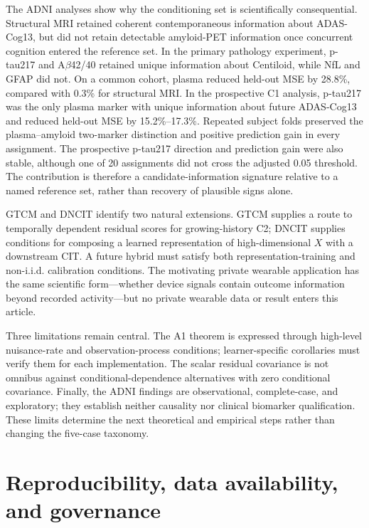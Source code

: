 \documentclass[11pt]{article}
\theoremstyle{definition}
\begin{document}
The ADNI analyses show why the conditioning set is scientifically consequential. Structural
MRI retained coherent contemporaneous information about ADAS-Cog13, but did not retain
detectable amyloid-PET information once concurrent cognition entered the reference set. In
the primary pathology experiment, p-tau217 and A$\beta$42/40 retained unique information
about Centiloid, while NfL and GFAP did not. On a common cohort, plasma reduced held-out MSE
by 28.8\%, compared with 0.3\% for structural MRI. In the prospective C1 analysis, p-tau217
was the only plasma marker with unique information about future ADAS-Cog13 and reduced
held-out MSE by 15.2\%--17.3\%. Repeated subject folds preserved the plasma--amyloid
two-marker distinction and positive prediction gain in every assignment. The prospective
p-tau217 direction and prediction gain were also stable, although one of 20 assignments did
not cross the adjusted 0.05 threshold. The contribution is therefore a candidate-information
signature relative to a named reference set, rather than recovery of plausible signs alone.

GTCM and DNCIT identify two natural extensions. GTCM supplies a route to temporally
dependent residual scores for growing-history C2; DNCIT supplies conditions for composing a
learned representation of high-dimensional $X$ with a downstream CIT. A future hybrid must
satisfy both representation-training and non-i.i.d. calibration conditions. The motivating
private wearable application has the same scientific form---whether device signals contain
outcome information beyond recorded activity---but no private wearable data or result enters
this article.

Three limitations remain central. The A1 theorem is expressed through high-level nuisance-rate
and observation-process conditions; learner-specific corollaries must verify them for each
implementation. The scalar residual covariance is not omnibus against conditional-dependence
alternatives with zero conditional covariance. Finally, the ADNI findings are observational,
complete-case, and exploratory; they establish neither causality nor clinical biomarker
qualification. These limits determine the next theoretical and empirical steps rather than
changing the five-case taxonomy.

\section{Reproducibility, data availability, and governance}
\end{document}
